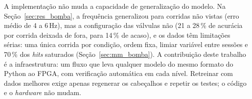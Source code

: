 A implementação não muda a capacidade de generalização do modelo. Na Seção~\ref{sec:res_bomba}, a frequência generalizou para corridas não vistas (erro médio de 4 a 6\,Hz), mas a configuração das válvulas não (21 a 28\,\% de acurácia por corrida deixada de fora, para 14\,\% de acaso), e os dados têm limitações sérias: uma única corrida por condição, ordem fixa, limiar variável entre sessões e 70\,\% dos \textit{hits} saturados (Seção~\ref{sec:mm_bomba}). A contribuição deste trabalho é a infraestrutura: um fluxo que leva qualquer modelo do mesmo formato do Python ao FPGA, com verificação automática em cada nível. Retreinar com dados melhores exige apenas regenerar os cabeçalhos e repetir os testes; o código e o \textit{hardware} não mudam.

